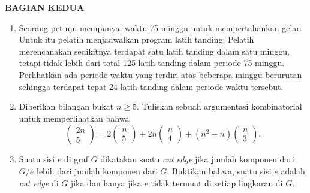 \documentclass[12pt,twoside]{article}
\begin{document}
\newpage \textbf{BAGIAN KEDUA}
\begin{enumerate}
	\item Seorang petinju mempunyai waktu 75 minggu untuk mempertahankan gelar. Untuk itu pelatih menjadwalkan program latih tanding. Pelatih merencanakan sedikitnya terdapat satu latih tanding dalam satu minggu, tetapi tidak lebih dari total 125 latih tanding dalam periode 75 minggu. Perlihatkan ada periode waktu yang terdiri atas beberapa minggu berurutan sehingga terdapat tepat 24 latih tanding dalam periode waktu tersebut.

	\item Diberikan bilangan bukat $n \geq 5.$ Tuliskan sebuah argumentasi kombinatorial untuk memperlihatkan bahwa
	      \begin{equation*}
		      \begin{pmatrix}
			      2n \\5
		      \end{pmatrix} = 2 \begin{pmatrix}
			      n \\5
		      \end{pmatrix} + 2n \begin{pmatrix}
			      n \\4
		      \end{pmatrix}+ (n^2-n)\begin{pmatrix}
			      n \\3
		      \end{pmatrix}.
	      \end{equation*}

	\item Suatu sisi $e$ di graf $G$ dikatakan suatu \textit{cut edge} jika jumlah komponen dari $G/e$ lebih dari jumlah komponen dari $G$. Buktikan bahwa, suatu sisi $e$ adalah \textit{cut edge} di $G$ jika dan hanya jika $e$ tidak termuat di setiap lingkaran di $G$.

\end{enumerate}

\pagebreak
\end{document}
